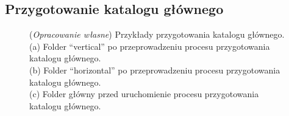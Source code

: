\documentclass{article}
\begin{document}
    \subsection{Przygotowanie katalogu głównego}
    \begin{figure}[H]
        \centering
        \qquad
        \qquad
        \caption
        {
            (\textit{Opracowanie własne}) Przykłady przygotowania katalogu głównego.\\
            (a) Folder ``vertical'' po przeprowadzeniu procesu przygotowania katalogu głównego.\\
            (b) Folder ``horizontal'' po przeprowadzeniu procesu przygotowania katalogu głównego.\\
            (c) Folder główny przed uruchomienie procesu przygotowania katalogu głównego.\\
        }
        \label{przygotowanie katalogu glownego}
    \end{figure}
\end{document}

